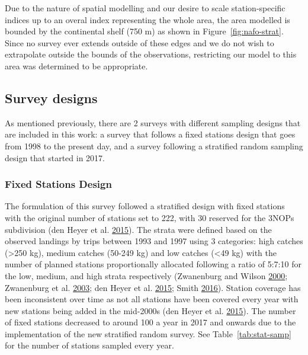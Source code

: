 \documentclass[12pt]{article}\usepackage[]{graphicx}\usepackage[]{color}
\begin{document}
Due to the nature of spatial modelling and our desire to scale station-specific indices up to an overal index representing the whole area, the area modelled is bounded by the continental shelf (750 m) as shown in Figure~\ref{fig:nafo-strat}. Since no survey ever extends outside of these edges and we do not wish to extrapolate outside the bounds of the observations, restricting our model to this area was determined to be appropriate.

\hypertarget{survey-designs}{%
\subsection{Survey designs}\label{survey-designs}}

As mentioned previously, there are 2 surveys with different sampling designs that are included in this work: a survey that follows a fixed stations design that goes from 1998 to the present day, and a survey following a stratified random sampling design that started in 2017.

\hypertarget{fixed-stations-design}{%
\subsubsection{Fixed Stations Design}\label{fixed-stations-design}}

The formulation of this survey followed a stratified design with fixed stations with the original number of stations set to 222, with 30 reserved for the 3NOPs subdivision (den Heyer et al. \protect\hyperlink{ref-DenHeyer2015}{2015}). The strata were defined based on the observed landings by trips between 1993 and 1997 using 3 categories: high catches (\textgreater250 kg), medium catches (50-249 kg) and low catches (\textless49 kg) with the number of planned stations proportionally allocated following a ratio of 5:7:10 for the low, medium, and high strata respectively (Zwanenburg and Wilson \protect\hyperlink{ref-Zwanenburg2000}{2000}; Zwanenburg et al. \protect\hyperlink{ref-Zwanenburg2003}{2003}; den Heyer et al. \protect\hyperlink{ref-DenHeyer2015}{2015}; Smith \protect\hyperlink{ref-Smith2016a}{2016}). Station coverage has been inconsistent over time as not all stations have been covered every year with new stations being added in the mid-2000s (den Heyer et al. \protect\hyperlink{ref-DenHeyer2015}{2015}). The number of fixed stations decreased to around 100 a year in 2017 and onwards due to the implementation of the new stratified random survey. See Table~\ref{tab:stat-samp} for the number of stations sampled every year.
\end{document}
